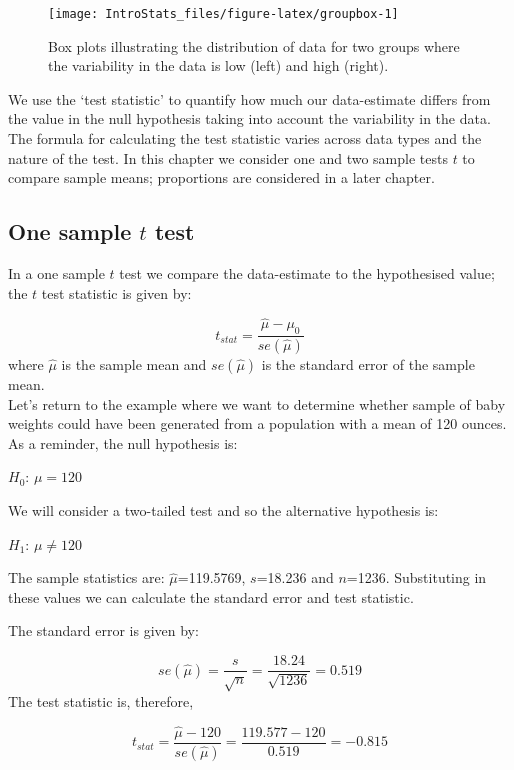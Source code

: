 \documentclass[
  oneside]{krantz}
\begin{document}
\begin{figure}

{\centering \texttt{[image: IntroStats\_files/figure-latex/groupbox-1]} 

}

\caption{Box plots illustrating the distribution of data for two groups where the variability in the data is low (left) and high (right).}\label{fig:groupbox}
\end{figure}

We use the `test statistic' to quantify how much our data-estimate differs from the value in the null hypothesis taking into account the variability in the data. The formula for calculating the test statistic varies across data types and the nature of the test. In this chapter we consider one and two sample tests \(t\) to compare sample means; proportions are considered in a later chapter.

\hypertarget{one-sample-t-test}{%
\subsection{\texorpdfstring{One sample \(t\) test}{One sample t test}}\label{one-sample-t-test}}

In a one sample \(t\) test we compare the data-estimate to the hypothesised value; the \(t\) test statistic is given by:

\[t_{stat}=\frac{\hat \mu - \mu_0}{se(\hat \mu)}\]
where \(\hat \mu\) is the sample mean and \(se(\hat \mu)\) is the standard error of the sample mean.\\
Let's return to the example where we want to determine whether sample of baby weights could have been generated from a population with a mean of 120 ounces. As a reminder, the null hypothesis is:

\(H_0\): \({\mu} = 120\)

We will consider a two-tailed test and so the alternative hypothesis is:

\(H_1\): \({\mu} \neq 120\)

The sample statistics are: \(\hat\mu\)=119.5769, \(s\)=18.236 and \(n\)=1236. Substituting in these values we can calculate the standard error and test statistic.

The standard error is given by:

\[se(\hat\mu) = \frac{s}{\sqrt{n}} = \frac{18.24}{\sqrt{1236}} = 0.519\]
The test statistic is, therefore,

\[t_{stat}=\frac{\hat{\mu} - 120}{se(\hat{\mu})} = \frac{119.577 - 120}{0.519} = -0.815\]
\end{document}
